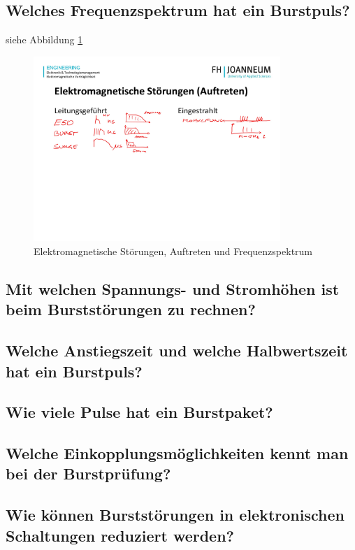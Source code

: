 \subsection{Welches Frequenzspektrum hat ein Burstpuls?}
siehe Abbildung \ref{fig:lv4:electro_interferences}
\begin{figure}[ht]
  \centering
  \includegraphics[height=7cm]{src/assets/pictures/lv4_elektromagnetische_stoerungen.jpg}
  \caption{Elektromagnetische Störungen, Auftreten und Frequenzspektrum}\label{fig:lv4:electro_interferences}
\end{figure}

\subsection{Mit welchen Spannungs- und Stromhöhen ist beim Burststörungen zu rechnen?}

\subsection{Welche Anstiegszeit und welche Halbwertszeit hat ein Burstpuls?}

\subsection{Wie viele Pulse hat ein Burstpaket?}

\subsection{Welche Einkopplungsmöglichkeiten kennt man bei der Burstprüfung?}

\subsection{Wie können Burststörungen in elektronischen Schaltungen reduziert werden?}

